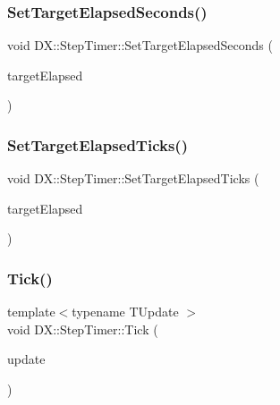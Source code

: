 \subsubsection{\texorpdfstring{Set\+Target\+Elapsed\+Seconds()}{SetTargetElapsedSeconds()}}
{\footnotesize\ttfamily void D\+X\+::\+Step\+Timer\+::\+Set\+Target\+Elapsed\+Seconds (\begin{DoxyParamCaption}\item[{double}]{target\+Elapsed }\end{DoxyParamCaption})\hspace{0.3cm}{\ttfamily [inline]}}

\mbox{\label{class_d_x_1_1_step_timer_ae026efbd3f030937bd5bd2d0326d825e}} 
\subsubsection{\texorpdfstring{Set\+Target\+Elapsed\+Ticks()}{SetTargetElapsedTicks()}}
{\footnotesize\ttfamily void D\+X\+::\+Step\+Timer\+::\+Set\+Target\+Elapsed\+Ticks (\begin{DoxyParamCaption}\item[{uint64}]{target\+Elapsed }\end{DoxyParamCaption})\hspace{0.3cm}{\ttfamily [inline]}}

\mbox{\label{class_d_x_1_1_step_timer_a758b88f80e00fabee7167885476681ee}} 
\subsubsection{\texorpdfstring{Tick()}{Tick()}}
{\footnotesize\ttfamily template$<$typename T\+Update $>$ \\
void D\+X\+::\+Step\+Timer\+::\+Tick (\begin{DoxyParamCaption}\item[{const T\+Update \&}]{update }\end{DoxyParamCaption})\hspace{0.3cm}{\ttfamily [inline]}}

